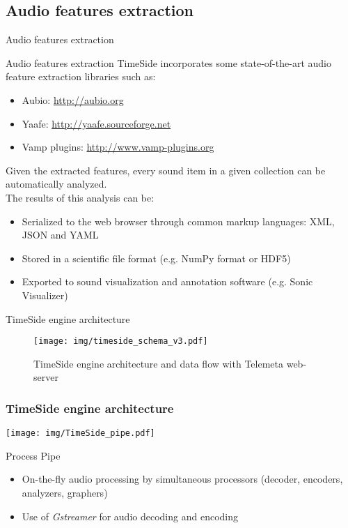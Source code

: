 \documentclass[final, hyperref, table]{beamer}
\begin{document}
\subsection{Audio features extraction}
\begin{frame}{Audio features extraction}
\begin{block}{Audio features extraction}
TimeSide incorporates some state-of-the-art \alert{audio feature extraction libraries} such as:
\vspace{-0.1cm}
\begin{itemize}
\item Aubio:
    \colorbox{yellow!30}{\scriptsize \url{http://aubio.org}}
\vspace{-0.1cm}
\item Yaafe:
    \colorbox{yellow!30}{\scriptsize \url{http://yaafe.sourceforge.net}}
\vspace{-0.1cm}
\item Vamp plugins:  
    \colorbox{yellow!30}{\scriptsize \url{http://www.vamp-plugins.org}}
\end{itemize}

Given the extracted features, every sound item in a given
  collection can be automatically analyzed.\\
The results of this
  analysis can be:
  \begin{itemize}\footnotesize
 \item Serialized to the web browser through common markup languages:
    XML, JSON and YAML
  \item Stored in a scientific file format (e.g. NumPy format or
    HDF5)
  \item Exported to sound visualization and annotation software
    (e.g. Sonic Visualizer)
 
  \end{itemize}
\end{block}

\end{frame}
\begin{frame}{TimeSide engine architecture}
  \begin{figure}[htbp]
  \centering
  \texttt{[image: img/timeside\_schema\_v3.pdf]}
  \caption{TimeSide engine architecture and data flow with Telemeta web-server}\label{fig:TimeSide_Archi}
\end{figure}
\end{frame}
  
\begin{frame}
  \frametitle{TimeSide engine architecture}
  \begin{center}
    \texttt{[image: img/TimeSide\_pipe.pdf]}
  \end{center}
  \begin{block}{Process Pipe}
    \begin{itemize}
    \item On-the-fly audio processing by simultaneous processors (decoder, encoders, analyzers, graphers)
    \item Use of \emph{Gstreamer} for audio decoding and encoding    \end{itemize}
  \end{block}
\end{frame}
\end{document}

